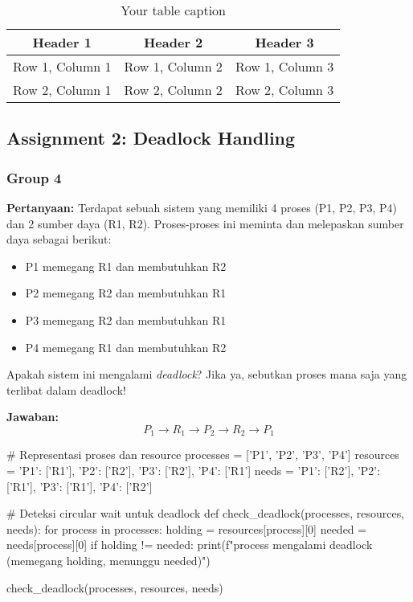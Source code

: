 \documentclass[12pt]{article}
\begin{document}
\begin{table}[htbp] %
    \centering
    \begin{tabular}{|c|c|c|} %
    \hline
    Header 1 & Header 2 & Header 3 \\ %
    \hline
    Row 1, Column 1 & Row 1, Column 2 & Row 1, Column 3 \\ %
    \hline
    Row 2, Column 1 & Row 2, Column 2 & Row 2, Column 3 \\ %
    \hline
    \end{tabular}
    \caption{Your table caption} %
    \label{tab:your_label} %
\end{table}
\subsection{Assignment 2: Deadlock Handling}
\subsubsection{Group 4}
\noindent
\textbf{Pertanyaan:}
Terdapat sebuah sistem yang memiliki 4 proses (P1, P2, P3, P4) dan 2 sumber daya (R1, R2). Proses-proses ini meminta dan melepaskan sumber daya sebagai berikut:
\begin{itemize}
    \item P1 memegang R1 dan membutuhkan R2
    \item P2 memegang R2 dan membutuhkan R1
    \item P3 memegang R2 dan membutuhkan R1
    \item P4 memegang R1 dan membutuhkan R2
\end{itemize}
Apakah sistem ini mengalami \textit{deadlock}? Jika ya, sebutkan proses mana saja yang terlibat dalam deadlock!

\noindent
\textbf{Jawaban:}
\[
P_1 \rightarrow R_1 \rightarrow P_2 \rightarrow R_2 \rightarrow P_1
\]
\begin{python}
# Representasi proses dan resource
processes = ['P1', 'P2', 'P3', 'P4']
resources = {'P1': ['R1'], 'P2': ['R2'], 'P3': ['R2'], 'P4': ['R1']}
needs = {'P1': ['R2'], 'P2': ['R1'], 'P3': ['R1'], 'P4': ['R2']}

# Deteksi circular wait untuk deadlock
def check_deadlock(processes, resources, needs):
    for process in processes:
        holding = resources[process][0]
        needed = needs[process][0]
        if holding != needed:
            print(f"{process} mengalami deadlock (memegang {holding}, menunggu {needed})")

check_deadlock(processes, resources, needs)
\end{python}
\end{document}

